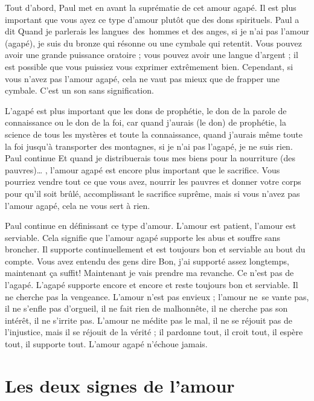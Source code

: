 Tout d'abord, Paul met en avant la suprématie de cet amour agapé.
 Il est plus important que vous ayez ce type d'amour
 plutôt que des dons spirituels. Paul a dit\frcolon{}
 \Og Quand je parlerais les langues~des~hommes et des anges,
 si je n'ai pas l'amour (agapé), je suis du bronze qui résonne
 ou une cymbale qui retentit. \Fg{}
 Vous pouvez avoir une grande puissance oratoire ;
 vous pouvez avoir une \Og langue d'argent \Fg{} ;
 il est possible que vous puissiez vous exprimer extrêmement bien.
 Cependant, si vous n'avez pas l'amour agapé, cela ne vaut pas mieux
 que de frapper une cymbale. C'est un son sans signification.

L'agapé est plus important que les dons de prophétie,
 le don de la parole de connaissance ou le don de la foi,
 car \Og quand j'aurais (le don) de prophétie,
 la science de tous les mystères et toute la connaissance,
 quand j'aurais même toute la foi jusqu'à transporter des montagnes,
 si je n'ai pas l'agapé, je ne suis rien. \Fg{} Paul continue\frcolon{}
 \Og Et quand je distribuerais tous mes biens
 pour la nourriture (des pauvres)\dots{} \Fg{},
 l'amour agapé est encore plus important que le sacrifice.
 Vous pourriez vendre tout ce que vous avez, nourrir les pauvres
 et donner votre corps pour qu'il soit brûlé, accomplissant le sacrifice
 suprême, mais si vous n'avez pas l'amour agapé,
 cela ne vous sert à rien.
 \nowidow[6]
 

Paul continue en définissant ce type d'amour.
 \Og L'amour est patient, l'amour est serviable. \Fg{}
 Cela signifie que l'amour agapé supporte les abus et souffre sans broncher.
 Il supporte continuellement et est toujours bon et serviable au bout du compte.
 Vous avez entendu des gens dire\frcolon{}
 \Og Bon, j'ai supporté assez longtemps, maintenant ça suffit!
 Maintenant je vais prendre ma revanche. \Fg{}
 Ce n'est pas de l'agapé. L'agapé supporte encore et encore
 et reste toujours bon et serviable. Il ne cherche pas la vengeance.
 \Og L'amour n'est pas envieux ; l'amour ne~se vante pas,
 il ne s'enfle pas d'orgueil, il ne fait rien de malhonnête,
 il ne cherche pas son intérêt, il ne s'irrite pas.
 L'amour ne médite pas le mal, il ne se réjouit pas de l'injustice,
 mais il se réjouit de la vérité ; il pardonne tout, il croit tout,
 il espère tout, il supporte tout. \Fg{}
 L'amour agapé \Og n'échoue jamais. \Fg{}


\section{Les deux signes de l'amour}

